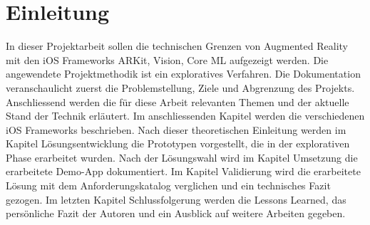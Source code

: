 \section{Einleitung}

In dieser Projektarbeit sollen die technischen Grenzen von Augmented Reality mit den iOS Frameworks ARKit, Vision, Core ML aufgezeigt werden. Die angewendete Projektmethodik ist ein exploratives Verfahren. 
Die Dokumentation veranschaulicht zuerst die Problemstellung, Ziele und Abgrenzung des Projekts. Anschliessend werden die für diese Arbeit relevanten Themen und der aktuelle Stand der Technik erläutert. Im anschliessenden Kapitel werden die verschiedenen iOS Frameworks beschrieben. Nach dieser theoretischen Einleitung werden im Kapitel Lösungsentwicklung die Prototypen vorgestellt, die in der explorativen Phase erarbeitet wurden. Nach der Lösungswahl wird im Kapitel Umsetzung die erarbeitete Demo-App dokumentiert. Im Kapitel Validierung wird die erarbeitete Lösung mit dem Anforderungskatalog verglichen und ein technisches Fazit gezogen. Im letzten Kapitel Schlussfolgerung werden die Lessons Learned, das persönliche Fazit der Autoren und ein Ausblick auf weitere Arbeiten gegeben.
